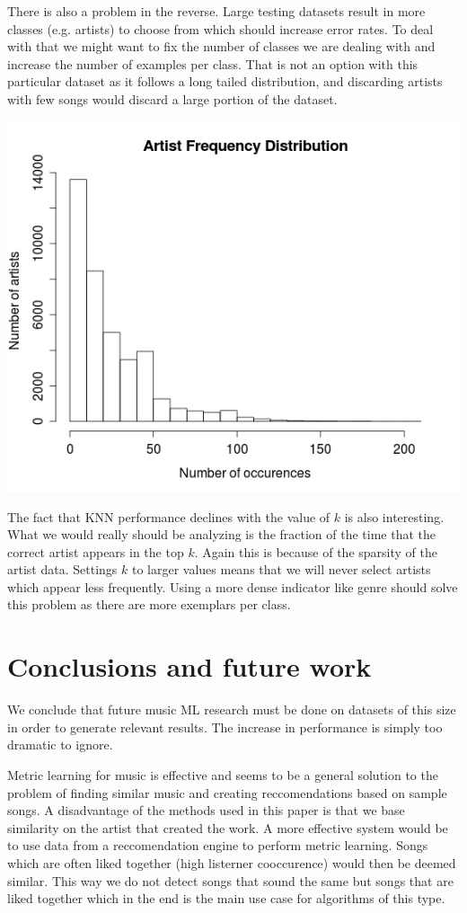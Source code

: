 \documentclass[a4paper,10pt]{article}
\begin{document}
There is also a problem in the reverse. Large testing datasets result in more classes (e.g. artists) to choose from which should increase error rates. To deal with that we might want to fix the number of classes we are dealing with and increase the number of examples per class. That is not an option with this particular dataset as it follows a long tailed distribution, and discarding artists with few songs would discard a large portion of the dataset.

\begin{center}
 \includegraphics[scale=0.4,keepaspectratio=true]{./artist_frequency_dist.png}
\end{center}

The fact that KNN performance declines with the value of $k$ is also interesting. What we would really should be analyzing is the fraction of the time that the correct artist appears in the top $k$. Again this is because of the sparsity of the artist data. Settings $k$ to larger values means that we will never select artists which appear less frequently. Using a more dense indicator like genre should solve this problem as there are more exemplars per class.

\section{Conclusions and future work}
We conclude that future music ML research must be done on datasets of this size in order to generate relevant results. The increase in performance is simply too dramatic to ignore.

Metric learning for music is effective and seems to be a general solution to the problem of finding similar music and creating reccomendations based on sample songs. A disadvantage of the methods used in this paper is that we base similarity on the artist that created the work. A more effective system would be to use data from a reccomendation engine to perform metric learning. Songs which are often liked together (high listerner cooccurence) would then be deemed similar. This way we do not detect songs that sound the same but songs that are liked together which in the end is the main use case for algorithms of this type. 
{}
\end{document}
